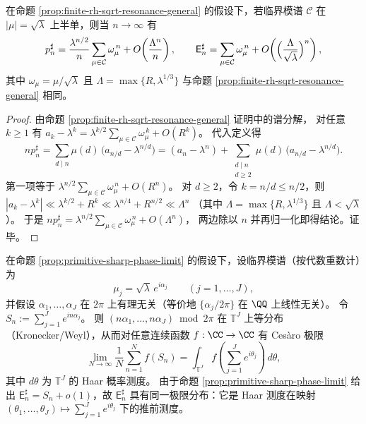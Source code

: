 \begin{proposition}\label{prop:primitive-sharp-phase-limit}
在命题 \ref{prop:finite-rh-sqrt-resonance-general} 的假设下，若临界模谱 \(\mathcal{C}\) 在 \(|\mu|=\sqrt{\lambda}\) 上半单，则当 \(n\to\infty\) 有
\[
p_n^\sharp
=\frac{\lambda^{n/2}}{n}\sum_{\mu\in\mathcal{C}}\omega_\mu^{\,n}
+O\!\left(\frac{\Lambda^n}{n}\right),
\qquad
\mathsf{E}_n^\sharp
=\sum_{\mu\in\mathcal{C}}\omega_\mu^{\,n}
+O\!\left(\Bigl(\frac{\Lambda}{\sqrt{\lambda}}\Bigr)^n\right),
\]
其中 \(\omega_\mu=\mu/\sqrt{\lambda}\) 且 \(\Lambda=\max\{R,\lambda^{1/3}\}\) 与命题 \ref{prop:finite-rh-sqrt-resonance-general} 相同。
\end{proposition}
\begin{proof}
由命题 \ref{prop:finite-rh-sqrt-resonance-general} 证明中的谱分解，
对任意 \(k\ge 1\) 有
\(
a_k-\lambda^k=\lambda^{k/2}\sum_{\mu\in\mathcal{C}}\omega_\mu^{\,k}+O(R^k)
\)。
代入定义得
\[
np_n^\sharp=\sum_{d\mid n}\mu(d)\,\bigl(a_{n/d}-\lambda^{n/d}\bigr)
=(a_n-\lambda^n)+\sum_{\substack{d\mid n\\ d\ge 2}}\mu(d)\,\bigl(a_{n/d}-\lambda^{n/d}\bigr).
\]
第一项等于 \(\lambda^{n/2}\sum_{\mu\in\mathcal{C}}\omega_\mu^{\,n}+O(R^n)\)。
对 \(d\ge 2\)，令 \(k=n/d\le n/2\)，则
\(
|a_k-\lambda^k|
\ll \lambda^{k/2}+R^k
\ll \lambda^{n/4}+R^{n/2}
\ll \Lambda^n
\)
（其中 \(\Lambda=\max\{R,\lambda^{1/3}\}\) 且 \(\Lambda<\sqrt{\lambda}\)）。
于是
\(
np_n^\sharp
=\lambda^{n/2}\sum_{\mu\in\mathcal{C}}\omega_\mu^{\,n}+O(\Lambda^n)
\)，
两边除以 \(n\) 并再归一化即得结论。证毕。
\end{proof}

\begin{remark}\label{rem:primitive-sharp-limit-law}
在命题 \ref{prop:primitive-sharp-phase-limit} 的假设下，设临界模谱（按代数重数计）为
\[
\mu_j=\sqrt{\lambda}\,e^{i\alpha_j}\qquad(j=1,\dots,J),
\]
并假设 \(\alpha_1,\dots,\alpha_J\) 在 \(2\pi\) 上有理无关（等价地 \(\{\alpha_j/2\pi\}\) 在 \(\QQ\) 上线性无关）。
令
\(
S_n:=\sum_{j=1}^{J}e^{in\alpha_j}
\)。
则 \((n\alpha_1,\dots,n\alpha_J)\bmod 2\pi\) 在 \(\mathbb{T}^J\) 上等分布（Kronecker/Weyl），从而对任意连续函数 \(f:\CC\to\CC\) 有 Ces\`aro 极限
\[
\lim_{N\to\infty}\frac{1}{N}\sum_{n=1}^{N} f(S_n)
=\int_{\mathbb{T}^J} f\!\left(\sum_{j=1}^{J}e^{i\theta_j}\right)\,d\theta,
\]
其中 \(d\theta\) 为 \(\mathbb{T}^J\) 的 Haar 概率测度。
由于命题 \ref{prop:primitive-sharp-phase-limit} 给出 \(\mathsf{E}_n^\sharp=S_n+o(1)\)，故 \(\mathsf{E}_n^\sharp\) 具有同一极限分布：它是 Haar 测度在映射 \((\theta_1,\dots,\theta_J)\mapsto\sum_{j=1}^{J}e^{i\theta_j}\) 下的推前测度。
\end{remark}

